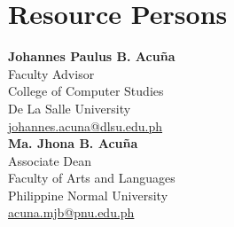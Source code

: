 \chapter{Resource Persons}
\newcommand{\resperson}[4]{\textbf{#1} \\ #2 \\ #3 \\ \url{#4}\vspace{2em}\\}

\resperson{Johannes Paulus B. Acuña}{Faculty Advisor}{College of Computer Studies\\De La Salle University}{johannes.acuna@dlsu.edu.ph}
\resperson{Ma. Jhona B. Acuña}{Associate Dean}{Faculty of Arts and 
Languages\\Philippine Normal University}{acuna.mjb@pnu.edu.ph}